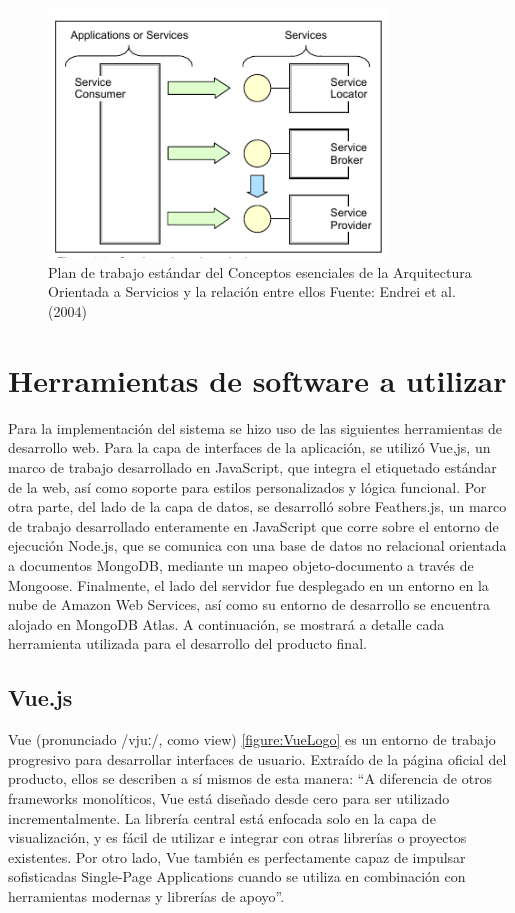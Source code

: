 \begin{figure}[H]
\centering
\includegraphics[width=0.80\textwidth]{img/7.png}
\caption{Plan de trabajo estándar del Conceptos esenciales de la Arquitectura Orientada a Servicios y la relación entre ellos
Fuente: Endrei et al. (2004)}
\label{figure:SOAworkflow}
\end{figure}

\section{Herramientas de software a utilizar}

Para la implementación del sistema se hizo uso de las siguientes herramientas de desarrollo web. Para la capa de interfaces de la aplicación, se utilizó Vue,js, un marco de trabajo desarrollado en JavaScript, que integra el etiquetado estándar de la web, así como soporte para estilos personalizados y lógica funcional. Por otra parte, del lado de la capa de datos, se desarrolló sobre Feathers.js, un marco de trabajo desarrollado enteramente en JavaScript que corre sobre el entorno de ejecución Node.js, que se comunica con una base de datos no relacional orientada a documentos MongoDB, mediante un mapeo objeto-documento a través de Mongoose. Finalmente, el lado del servidor fue desplegado en un entorno en la nube de Amazon Web Services, así como su entorno de desarrollo se encuentra alojado en MongoDB Atlas. A continuación, se mostrará a detalle cada herramienta utilizada para el desarrollo del producto final.

\subsection{Vue.js}

Vue (pronunciado /vjuː/, como view) \ref{figure:VueLogo} es un entorno de trabajo progresivo para desarrollar interfaces de usuario. Extraído de la página oficial del producto, ellos se describen a sí mismos de esta manera: “A diferencia de otros frameworks monolíticos, Vue está diseñado desde cero para ser utilizado incrementalmente. La librería central está enfocada solo en la capa de visualización, y es fácil de utilizar e integrar con otras librerías o proyectos existentes. Por otro lado, Vue también es perfectamente capaz de impulsar sofisticadas Single-Page Applications cuando se utiliza en combinación con herramientas modernas y librerías de apoyo”\cite{vuejs}.

